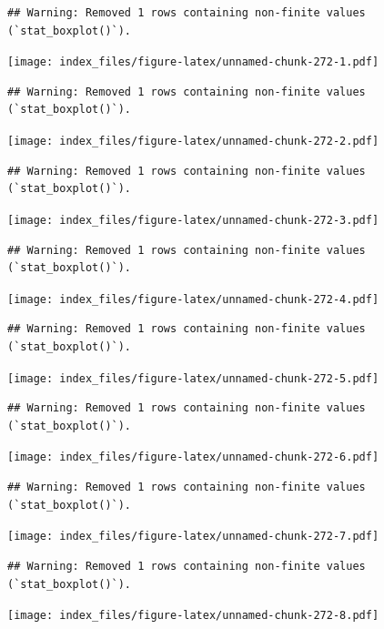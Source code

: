 \documentclass[
]{article}
\begin{document}
\begin{verbatim}
## Warning: Removed 1 rows containing non-finite values (`stat_boxplot()`).
\end{verbatim}

\texttt{[image: index\_files/figure-latex/unnamed-chunk-272-1.pdf]}

\begin{verbatim}
## Warning: Removed 1 rows containing non-finite values (`stat_boxplot()`).
\end{verbatim}

\texttt{[image: index\_files/figure-latex/unnamed-chunk-272-2.pdf]}

\begin{verbatim}
## Warning: Removed 1 rows containing non-finite values (`stat_boxplot()`).
\end{verbatim}

\texttt{[image: index\_files/figure-latex/unnamed-chunk-272-3.pdf]}

\begin{verbatim}
## Warning: Removed 1 rows containing non-finite values (`stat_boxplot()`).
\end{verbatim}

\texttt{[image: index\_files/figure-latex/unnamed-chunk-272-4.pdf]}

\begin{verbatim}
## Warning: Removed 1 rows containing non-finite values (`stat_boxplot()`).
\end{verbatim}

\texttt{[image: index\_files/figure-latex/unnamed-chunk-272-5.pdf]}

\begin{verbatim}
## Warning: Removed 1 rows containing non-finite values (`stat_boxplot()`).
\end{verbatim}

\texttt{[image: index\_files/figure-latex/unnamed-chunk-272-6.pdf]}

\begin{verbatim}
## Warning: Removed 1 rows containing non-finite values (`stat_boxplot()`).
\end{verbatim}

\texttt{[image: index\_files/figure-latex/unnamed-chunk-272-7.pdf]}

\begin{verbatim}
## Warning: Removed 1 rows containing non-finite values (`stat_boxplot()`).
\end{verbatim}

\texttt{[image: index\_files/figure-latex/unnamed-chunk-272-8.pdf]}
\end{document}
